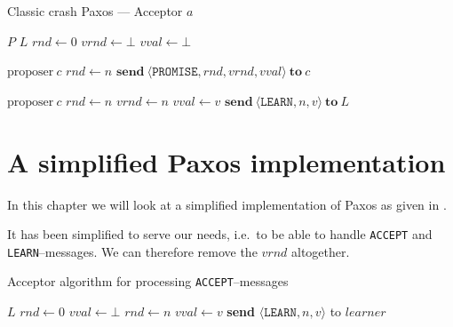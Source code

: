 \begin{algorithm}
  \caption{Classic crash Paxos --- Acceptor $a$}
  \label{algorithm:paxos.full.acceptor}
  \begin{algorithmic}
    \State $P$
    \State $L$
    \State $rnd \gets 0$
    \State $vrnd \gets \bot$
    \State $vval \gets \bot$
    \State

       {$\text{proposer}\ c$}
       \State $rnd \gets n$
       \State $\textbf{send}\ \langle \texttt{PROMISE}, rnd, vrnd, vval\rangle\ \textbf{to}\ c$
    \EndOn
    \State

       {$\text{proposer}\ c$}
       \State $rnd \gets n$
       \State $vrnd \gets n$
       \State $vval \gets v$
       \State $\textbf{send}\ \langle \texttt{LEARN}, n, v \rangle\ \textbf{to}\ L$
    \EndOn
  \end{algorithmic}
\end{algorithm}


\section{A simplified Paxos implementation}

In this chapter we will look at a simplified implementation of Paxos as
given in \cite{Insane.Paxos}.

It has been simplified to serve our needs, i.e.~to be able to handle
\texttt{ACCEPT} and \texttt{LEARN}--messages.  We can therefore remove the
$vrnd$ altogether.


\begin{algorithm}[H]
  \caption{Acceptor algorithm for processing \texttt{ACCEPT}--messages}
  \label{paxos.algorithm.acceptor}
  \begin{algorithmic}
    \State $L$
    \State $rnd \gets 0$ 
    \State $vval \gets \bot$ 
    \State
        \State $rnd\gets n$
        \State $vval\gets v$
           \State \textbf{send} $\langle \texttt{LEARN}, n, v \rangle $ to $learner$
        \EndForIn
      \EndIf
    \EndOn
  \end{algorithmic}
\end{algorithm}

